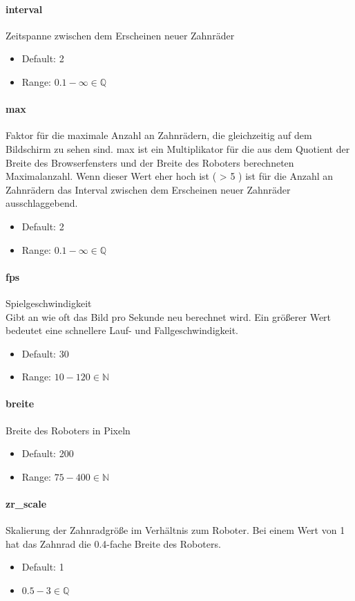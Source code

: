 \documentclass[]{article}
\begin{document}
\begin{multicols}{2}
	\paragraph{interval}  Zeitspanne zwischen dem Erscheinen neuer Zahnräder
	\begin{itemize}
		\item Default: 2
		\item Range: $ 0.1 - \infty \in \mathbb{Q}$
	\end{itemize}
	\paragraph{max}  Faktor für die maximale Anzahl an Zahnrädern, die gleichzeitig auf dem Bildschirm zu sehen sind.  max ist ein Multiplikator für die aus dem Quotient der Breite des Browserfensters und der Breite des Roboters berechneten Maximalanzahl. Wenn dieser Wert eher hoch ist ( > 5 ) ist für die Anzahl an Zahnrädern das Interval zwischen dem Erscheinen neuer Zahnräder ausschlaggebend.
	\begin{itemize}
		\item Default: 2
		\item Range: $ 0.1 - \infty \in \mathbb{Q}$
	\end{itemize}


	\paragraph{fps}  Spielgeschwindigkeit \\
	Gibt an wie oft das Bild pro Sekunde neu berechnet wird. Ein größerer Wert bedeutet eine schnellere Lauf- und Fallgeschwindigkeit.
	\begin{itemize}

		\item Default: 30
		\item Range: $ 10 - 120 \in \mathbb{N} $

	\end{itemize}
	\paragraph{breite}  Breite des Roboters in Pixeln
	\begin{itemize}
		\item Default: 200
		\item Range: $ 75 - 400  \in \mathbb{N}$
	\end{itemize}
	\paragraph{zr\_scale}  Skalierung der Zahnradgröße im Verhältnis zum Roboter. Bei einem Wert von 1 hat das Zahnrad die 0.4-fache Breite des Roboters.
	\begin{itemize}
		\item Default: 1
		\item $ 0.5 - 3 \in \mathbb{Q} $
	\end{itemize}

 
	\end{multicols}
\end{document}
